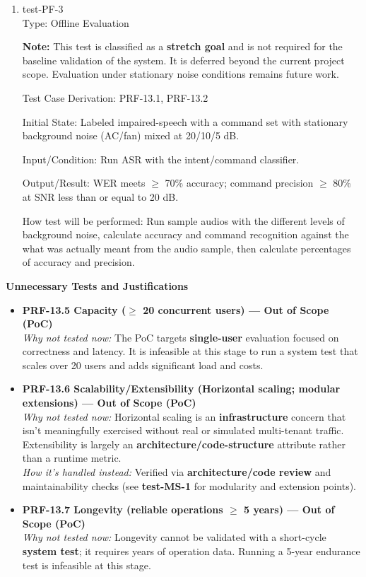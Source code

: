 \documentclass[12pt, titlepage]{article}
\begin{document}
\begin{enumerate}
\item{test-PF-3\\}
Type: Offline Evaluation

\textbf{Note:} This test is classified as a \textbf{stretch goal} and is not required for the baseline validation of the system. It is deferred beyond the current project scope. Evaluation under stationary noise conditions remains future work.

Test Case Derivation: PRF-13.1, PRF-13.2

Initial State: Labeled impaired-speech with a command set with stationary background noise (AC/fan) mixed at 20/10/5 dB.

Input/Condition: Run ASR with the intent/command classifier.

Output/Result: WER meets $\geq$ 70\% accuracy; command precision $\geq$ 80\% at SNR less than or equal to 20 dB.

How test will be performed: Run sample audios with the different levels of background noise, calculate accuracy and command recognition against the what was actually meant from the audio sample, then calculate percentages of accuracy and precision.
\end{enumerate}

\noindent\textbf{Unnecessary Tests and Justifications}
\begin{itemize}
\item \textbf{PRF-13.5 Capacity ($\geq$ 20 concurrent users) — Out of Scope (PoC)}\\
\emph{Why not tested now:} The PoC targets \textbf{single-user} evaluation focused on correctness and latency. It is infeasible at this stage to run a system test that scales over 20 users and adds significant load and costs.
\item \textbf{PRF-13.6 Scalability/Extensibility (Horizontal scaling; modular extensions) — Out of Scope (PoC)}\\
\emph{Why not tested now:} Horizontal scaling is an \textbf{infrastructure} concern that isn’t meaningfully exercised without real or simulated multi-tenant traffic. Extensibility is largely an \textbf{architecture/code-structure} attribute rather than a runtime metric.\\
\emph{How it’s handled instead:} Verified via \textbf{architecture/code review} and maintainability checks (see \textbf{test-MS-1} for modularity and extension points).
\item \textbf{PRF-13.7 Longevity (reliable operations $\geq$ 5 years) — Out of Scope (PoC)}\\
\emph{Why not tested now:} Longevity cannot be validated with a short-cycle \textbf{system test}; it requires years of operation data. Running a 5-year endurance test is infeasible at this stage.
\end{itemize}
\end{document}
